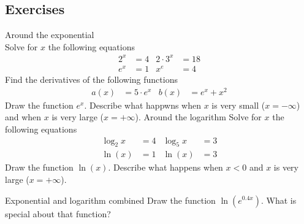 \documentclass[a4paper]{report}
\begin{document}
\subsection{Exercises}
\begin{Exercise}[title= Answer the following questions,label=exexln,difficulty=1]
\Question Around the exponential\\ 
\subQuestion Solve for $x$ the following equations
\begin{align*}
2^x &= 4			&  2\cdot 3^x&=18 \\
e^x &= 1			&  x^e&=4
\end{align*}
\subQuestion Find the derivatives of the following functions
\begin{align*}
a(x) &= 5\cdot e^x			&  b(x)&=e^x + x^2 
\end{align*}
\subQuestion Draw the function $e^x$. Describe what happwns when $x$ is very small ($x=- \infty$) and when $x$ is very large ($x=+\infty$).
\Question Around the logarithm
\subQuestion Solve for $x$ the following equations
\begin{align*}
\log_2{x} &= 4			& \log_5{x} &=3 \\
\ln(x) &= 1			&  \ln(x)&=3
\end{align*}
\subQuestion Draw the function $\ln(x)$. Describe what happens when $x<0$ and $x$ is very large ($x=+\infty$).

\Question Exponential and logarithm combined
\subQuestion Draw the function $\ln(e^{0.4x})$.
\subQuestion What is special about that function?
\end{Exercise}
\end{document}
